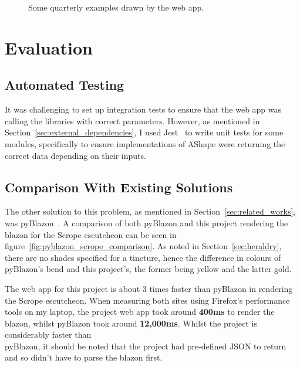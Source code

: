\documentclass[nobib, a4paper, twoside, justified]{tufte-book}
\begin{document}
\begin{figure}[h]
  \qquad
  \caption{Some quarterly examples drawn by the web app.}%
  \label{fig:quarterly_shields}
\end{figure}

\chapter{Evaluation}%
\label{cha:evaluation}

\section{Automated Testing}%
\label{sec:automated_testing}

It was challenging to set up integration tests to ensure that the web app was calling the libraries
with correct parameters. However, as mentioned in Section~\ref{sec:external_dependencies}, I used
Jest~\autocite{jest} to write unit tests for some modules, specifically to ensure implementations
of AShape were returning the correct data depending on their inputs.

\section{Comparison With Existing Solutions}%
\label{sec:comparison_with_existing_solutions}

The other solution to this problem, as mentioned in Section~\ref{sec:related_works}, was
pyBlazon~\autocite{pyblazon}. A comparison of both pyBlazon and this project rendering the
blazon for the Scrope \gls{escutcheon} can be seen in figure~\ref{fig:pyblazon_scrope_comparison}.
As noted in Section~\ref{sec:heraldry}, there are no shades specified for a tincture, hence the
difference in colours of pyBlazon's bend and this project's, the former being yellow and the latter
gold.

The web app for this project is about 3 times faster than pyBlazon in rendering the Scrope
escutcheon. When measuring both sites using Firefox's performance tools on my laptop, the project
web app took around \textbf{400ms} to render the blazon, whilst pyBlazon took around
\textbf{12,000ms}. Whilst the project is considerably faster than\\ pyBlazon, it should be noted
that the project had pre-defined JSON to return and so didn't have to parse the blazon first.
\end{document}

